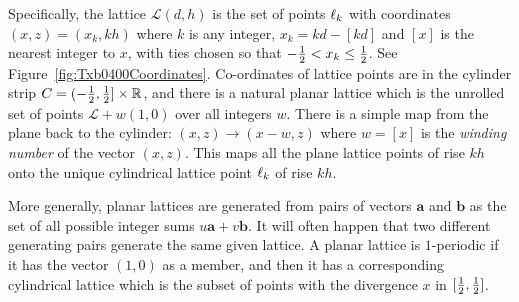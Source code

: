 
\newcommand{\dk}{x_k}\newcommand{\dm}{x_m}\newcommand{\dn}{x_n}\newcommand{\dmn}{x_{m+n}}
Specifically, the lattice  $\mathcal{L}(d,h)$ is the set of points  $\ell_{{k}}$ with coordinates  $(x,z)=(\dk,kh)$ where $k$
is any integer, $\dk=kd-[kd]$ and $[x]$ is the nearest integer to $x$, with ties chosen so that $-\jhalf < \dk \leq \jhalf$.%
See Figure~\ref{fig:Txb0400Coordinates}. 
Co-ordinates of lattice points are in the cylinder strip $C=(-\textstyle{\frac{1}{2}},\textstyle{\frac{1}{2}}]\times\mathbb{R}$, and there is a natural 
{planar lattice}  which is the unrolled set of points $\mathcal{L}+w (1,0)$ over all integers $w$. 
There is a simple map from the plane back to the cylinder: $(x,z)\rightarrow(x-w,z)$ where $w=[x]$ is the \emph{winding number} of the vector $(x,z)$. This maps all the plane lattice points of rise $kh$ onto the unique cylindrical lattice point $\ell_{{k}}$ of rise $kh$. 

More generally, planar lattices are generated from pairs of vectors $\mathbf{a}$ and $\mathbf{b}$ as the set of all possible integer sums  $u \mathbf{a}+ v\mathbf{b}$. It will often happen that two different generating pairs generate the same given lattice. A planar lattice is $1$-periodic if it has the vector $(1,0)$ as a member, and then it has a corresponding cylindrical lattice which is the subset of points with the divergence $x$ in $[\textstyle{\frac{1}{2}},\textstyle{\frac{1}{2}}]$.  

